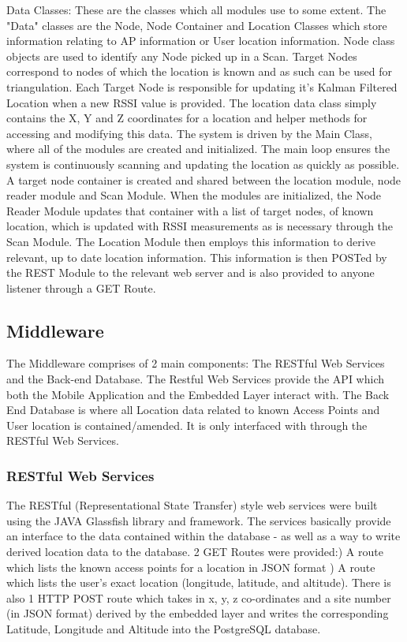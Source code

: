 \documentclass[conference]{IEEEtran}
\begin{document}
Data Classes: These are the classes which all modules use to some extent. The "Data" classes are the Node, Node Container and Location Classes which store information relating to AP information or User location information. Node class objects are used to identify any Node picked up in a Scan. Target Nodes correspond to nodes of which the location is known and as such can be used for triangulation. Each Target Node is responsible for updating it's Kalman Filtered Location when a new RSSI value is provided. The location data class simply contains the X, Y and Z coordinates for a location and helper methods for accessing and modifying this data. 
\newline
The system is driven by the Main Class, where all of the modules are created and initialized. The main loop ensures the system is continuously scanning and updating the location as quickly as possible. A target node container is created and shared between the location module, node reader module and Scan Module. When the modules are initialized, the Node Reader Module updates that container with a list of target nodes, of known location, which is updated with RSSI measurements as is necessary through the Scan Module. The Location Module then employs this information to derive relevant, up to date location information. This information is then POSTed by the REST Module to the relevant web server and is also provided to anyone listener through a GET Route.

\subsection{Middleware}
The Middleware comprises of 2 main components:\newline
The RESTful Web Services and the Back-end Database. The Restful Web Services provide the API which both the Mobile Application and the Embedded Layer interact with.
The Back End Database is where all Location data related to known Access Points and User location is contained/amended. It is only interfaced with through the RESTful Web Services.
\newline
\subsubsection{RESTful Web Services}
The RESTful (Representational State Transfer) style web services were built using the JAVA Glassfish library and framework. The services basically provide an interface to the data contained within the database - as well as a way to write derived location data to the database. 2 GET Routes were provided:) A route which lists the known access points for a location in JSON format ) A route which lists the user's exact location (longitude, latitude, and altitude).
\newline
There is also 1 HTTP POST route which takes in x, y, z co-ordinates and a site number (in JSON format) derived by the embedded layer and writes the corresponding Latitude, Longitude and Altitude into the PostgreSQL database.
\newline
\end{document}
